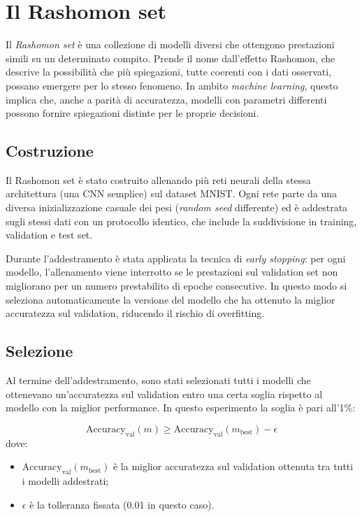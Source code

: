 \documentclass{article}
\begin{document}
\section{Il Rashomon set}

Il \emph{Rashomon set} è una collezione di modelli diversi che ottengono
prestazioni simili su un determinato compito. Prende il nome dall’effetto
Rashomon, che descrive la possibilità che più spiegazioni, tutte coerenti con i
dati osservati, possano emergere per lo stesso fenomeno. In ambito
\emph{machine learning}, questo implica che, anche a parità di accuratezza,
modelli con parametri differenti possono fornire spiegazioni distinte per le
proprie decisioni.

\subsection{Costruzione}
Il Rashomon set è stato costruito allenando più reti neurali della stessa
architettura (una CNN semplice) sul dataset MNIST. Ogni rete parte da una
diversa inizializzazione casuale dei pesi (\emph{random seed} differente) ed è
addestrata sugli stessi dati con un protocollo identico, che include la
suddivisione in training, validation e test set.

Durante l’addestramento è stata applicata la tecnica di \emph{early stopping}:
per ogni modello, l’allenamento viene interrotto se le prestazioni sul
validation set non migliorano per un numero prestabilito di epoche consecutive.
In questo modo si seleziona automaticamente la versione del modello che ha
ottenuto la miglior accuratezza sul validation, riducendo il rischio di
overfitting.

\subsection{Selezione}
Al termine dell’addestramento, sono stati selezionati tutti i modelli che
ottenevano un’accuratezza sul validation entro una certa soglia rispetto al
modello con la miglior performance. In questo esperimento la soglia è pari
all’1\%:

\[
      \mathrm{Accuracy}_{\mathrm{val}}(m) \geq \mathrm{Accuracy}_{\mathrm{val}}(m_{\mathrm{best}}) - \epsilon
\]
dove:
\begin{itemize}
      \item $\mathrm{Accuracy}_{\mathrm{val}}(m_{\mathrm{best}})$ è la miglior accuratezza sul validation ottenuta tra tutti i modelli addestrati;
      \item $\epsilon$ è la tolleranza fissata (0.01 in questo caso).
\end{itemize}
\end{document}
